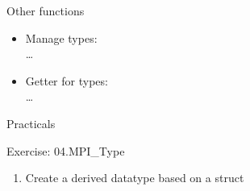 \documentclass[aspectratio=43]{beamer}
\begin{document}
\begin{frame}[fragile]{Other functions}
\begin{itemize}
    \item Manage types:\\\hspace{1cm} \ldots
    \item Getter for types:\\\hspace{1cm} \ldots
\end{itemize}
\end{frame}


\begin{frame}{Practicals}
    \begin{brown2block}{Exercise: 04.MPI\_Type}
    \begin{enumerate}
    \item Create a derived datatype based on a struct
    \end{enumerate}
    \end{brown2block}
\end{frame}



\end{document}
